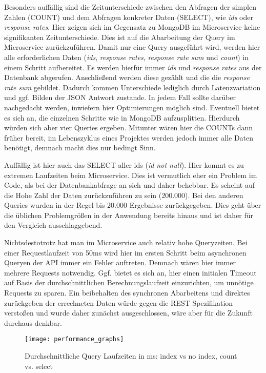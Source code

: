 Besonders auffällig sind die Zeitunterschiede zwischen den Abfragen der simplen Zahlen (COUNT) und dem Abfragen konkreter Daten (SELECT), wie \textit{ids} oder \textit{response rates}. Hier zeigen sich im Gegensatz zu MongoDB im Microservice keine signifikanten Zeitunterschiede. Dies ist auf die Abarbeitung der Query im Microservice zurückzuführen. Damit nur eine Query ausgeführt wird, werden hier alle erforderlichen Daten (\textit{ids}, \textit{response rates}, \textit{response rate sum} und \textit{count}) in einem Schritt aufbereitet. Es werden hierfür immer \textit{ids} und \textit{response rates} aus der Datenbank abgerufen. Anschließend werden diese gezählt und die die \textit{response rate sum} gebildet. Dadurch kommen Unterschiede lediglich durch Latenzvariation und ggf. Bilden der JSON Antwort zustande.
In jedem Fall sollte darüber nachgedacht werden, inwiefern hier Optimierungen möglich sind. Eventuell bietet es sich an, die einzelnen Schritte wie in MongoDB aufzusplitten. Hierdurch würden sich aber vier Queries ergeben. Mitunter wären hier die COUNTs dann früher bereit, im Lebenszyklus eines Projektes werden jedoch immer alle Daten benötigt, demnach macht dies nur bedingt Sinn. 

Auffällig ist hier auch das SELECT aller ids (\textit{id not null}). Hier kommt es zu extremen Laufzeiten beim Microservice. Dies ist vermutlich eher ein Problem im Code, als bei der Datenbankabfrage an sich und daher behebbar. Es scheint auf die Hohe Zahl der Daten zurückzuführen zu sein (200.000). Bei den anderen Queries wurden in der Regel bis 20.000 Ergebnisse zurückgegeben. Dies geht über die üblichen Problemgrößen in der Anwendung bereits hinaus und ist daher für den Vergleich ausschlaggebend.

Nichtsdestotrotz hat man im Microservice auch relativ hohe Queryzeiten. Bei einer Requestlaufzeit von 50ms wird hier im ersten Schritt beim asynchronen Queryen der API immer ein Fehler auftreten. Demnach wären hier immer mehrere Requests notwendig. Ggf. bietet es sich an, hier einen initialen Timeout auf Basis der durchschnittlichen Berechnungslaufzeit einzurichten, um unnötige Requests zu sparen. Ein beibehalten des synchronen Abarbeitens und direktes zurückgeben der errechneten Daten würde gegen die REST Spezifikation verstoßen und wurde daher zunächst ausgeschlossen, wäre aber für die Zukunft durchaus denkbar.

\begin{figure}[!ht]
    \centering
    \caption{Durchschnittliche Query Laufzeiten in ms: index vs no index, count vs. select}
    \label{fig:perftestgraph}
    \texttt{[image: performance\_graphs]}
\end{figure}

